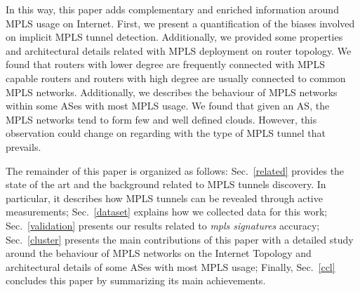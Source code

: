 In this way, this paper adds complementary and enriched information around MPLS
usage on Internet. First, we present a quantification of the biases involved on
implicit MPLS tunnel detection. Additionally, we provided some properties and
architectural details related with MPLS deployment on router topology. We found
that routers with lower degree are frequently connected with MPLS capable
routers and routers with high degree are usually connected to common MPLS
networks. Additionally, we describes the behaviour of MPLS networks within some
ASes with most MPLS usage. We found that given an AS, the MPLS networks tend to
form few and well defined clouds. However, this observation could change on
regarding with the type of MPLS tunnel that prevails.


The remainder of this paper is organized as follows: Sec.~\ref{related} provides
the state of the art and the background related to MPLS tunnels discovery. In
particular, it describes how MPLS tunnels can be revealed through active
measurements;  Sec.~\ref{dataset} explains how we collected data for this work;
Sec.~\ref{validation} presents our results related to \textit{mpls signatures}
accuracy; Sec.~\ref{cluster} presents the main contributions of this paper with
a detailed study around the behaviour of MPLS networks on the Internet Topology
and architectural details of some ASes with most MPLS usage; Finally,
Sec.~\ref{ccl} concludes this paper by summarizing its main achievements.


